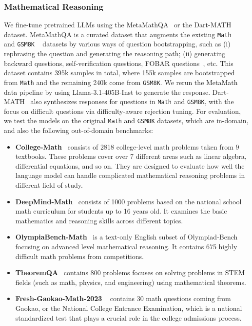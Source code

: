 \subsubsection{Mathematical Reasoning}
We fine-tune pretrained LLMs using the MetaMathQA~\cite{yu2023metamath} or the Dart-MATH~\cite{tong2024dart} dataset. 
MetaMathQA is a curated dataset that augments the existing \texttt{Math} ~\cite{math_dd} and \texttt{GSM8K} ~\cite{gsm8k_dd} datasets by various ways of question bootstrapping,
such as (i) rephrasing the question and generating the reasoning path; (ii) generating backward questions,  self-verification questions, FOBAR questions~\cite{jiang2024forward}, etc. This dataset contains 395k samples in total, where 155k samples are bootstrapped from \texttt{Math} and the remaining 240k come from \texttt{GSM8K}. We rerun the MetaMath data pipeline by using Llama-3.1-405B-Inst to generate the response. 
Dart-MATH~\cite{tong2024dart} also synthesizes responses for questions in \texttt{Math} and \texttt{GSM8K}, with the focus on difficult questions via difficulty-aware rejection tuning.
For evaluation, we test the models on the original \texttt{Math} and \texttt{GSM8K} datasets, which are in-domain,
and also the following out-of-domain benchmarks:
\vspace{-5pt}
\begin{itemize}[leftmargin=*]\itemsep0pt
    \item  \textbf{College-Math}~\cite{tang2024mathscale}
consists of 2818 college-level math problems taken from 9 textbooks. These problems cover over 7 different areas such as linear algebra, differential equations, and so on. They are designed to evaluate how well the language model can handle complicated mathematical reasoning problems in different field of study.

    \item  \textbf{DeepMind-Math}~\cite{saxton2019analysing} consists of 1000 problems based on the national school math curriculum for students up to 16 years old. It examines the basic mathematics and reasoning skills across different topics.

    \item  \textbf{OlympiaBench-Math}~\cite{he2024olympiadbench} 
is a text-only English subset of Olympiad-Bench focusing on advanced level mathematical reasoning. It
contains 675 highly difficult math problems from competitions. 

    \item  \textbf{TheoremQA}~\cite{chen2023theoremqa} contains 800 problems focuses on solving problems in STEM fields (such as math, physics, and engineering) using mathematical theorems.


    \item \textbf{Fresh-Gaokao-Math-2023} ~\cite{tang2024mathscale} contains 30 math questions coming from  Gaokao, or the National College Entrance Examination, which is a national standardized test that plays a crucial role in the college admissions process.
\end{itemize}

